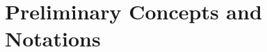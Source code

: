 
\pagestyle{MyFancy}
\color{gal}
\chapter{Preliminary Concepts and Notations}
\label{cap:preliminares}



\ifpdf
    \graphicspath{{Chapter1/figs/Raster/}{Chapter1/figs/PDF/}{Chapter1/figs/}}
\else
    \graphicspath{{Chapter1/figs/Vector/}{Chapter1/figs/}}
\fi

\PlaceText{69mm}{39mm}{ \color{gal}\noindent\makebox[\linewidth]{\rule{2\paperwidth}{1pt}}}

